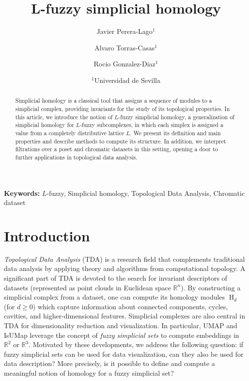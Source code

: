 \documentclass[a4paper,10pt]{article}
\newcommand{\keywords}[1]{\par\noindent\textbf{Keywords:} #1}
\newcommand{\bbr}{\mathbb{R}}
\DeclareMathOperator{\Ho}{H}
\begin{document}
\title{L-fuzzy simplicial homology}

\author{Javier Perera-Lago\(^1\) \and Alvaro Torras-Casas\(^1\) \and Rocio Gonzalez-Diaz\(^1\)}
\date{\(^1\)Universidad de Sevilla}

\maketitle

\begin{abstract}
Simplicial homology is a classical tool that assigns a sequence of modules to a simplicial complex, providing invariants for the study of its topological properties. In this article, we introduce the notion of \(L\)-fuzzy simplicial homology, a generalization of simplicial homology for \(L\)-fuzzy subcomplexes, in which each simplex is assigned a value from a completely distributive lattice \(L\). We present its definition and main properties and describe methods to compute its structure. In addition, we interpret filtrations over a poset and chromatic datasets in this setting, opening a door to further applications in topological data analysis.
\end{abstract}

\keywords{\(L\)-fuzzy, Simplicial homology, Topological Data Analysis, Chromatic dataset}



\section{Introduction}
\label{sec:introduction}

\emph{Topological Data Analysis} (TDA) is a research field that complements traditional data analysis by applying theory and algorithms from computational topology. A significant part of TDA is devoted to the search for invariant descriptors of datasets (represented as point clouds in Euclidean space \(\bbr^n\)). By constructing a simplicial complex from a dataset, one can compute its homology modules \(\Ho_d\) (for \(d\geq 0\)) which capture information about connected components, cycles, cavities, and higher-dimensional features. 
Simplicial complexes are also central in TDA for dimensionality reduction and visualization. 
In particular, UMAP \cite{mcinnes2018umap} and IsUMap \cite{barth2025fuzzy} leverage the concept of \emph{fuzzy simplicial sets} to compute embeddings in \(\bbr^2\) or \(\bbr^3\).
Motivated by these developments, we address the following question: if fuzzy simplicial sets can be used for data visualization, can they also be used for data description? More precisely, is it possible to define and compute a meaningful notion of homology for a fuzzy simplicial set?
\end{document}

